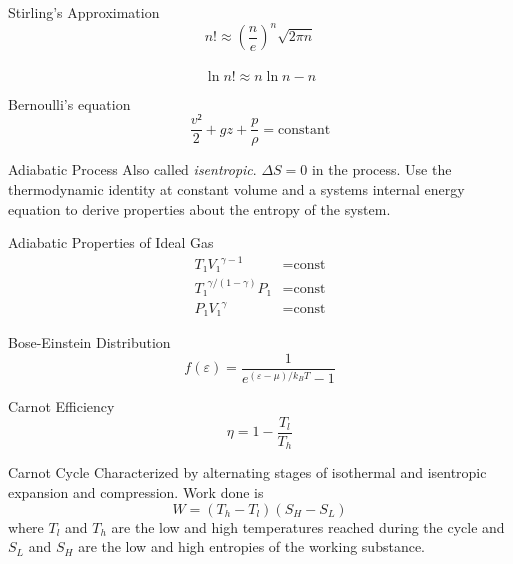 \documentclass[avery5371]{flashcards}
\begin{document}
\begin{flashcard}{Stirling's Approximation}
	\[ n! ≈ (\frac ne)^n \sqrt{2πn} \] \\
	\[ \ln n! ≈ n\ln n - n \]
\end{flashcard}


\begin{flashcard}{Bernoulli's equation}
	\[ \frac{v²}{2} + gz + \frac{p}{ρ} = \text{constant} \]
\end{flashcard}


\begin{flashcard}{Adiabatic Process}
	Also called \emph{isentropic}. $ΔS = 0$ in the process. Use the
	thermodynamic identity at constant volume and a systems internal energy
	equation to derive properties about the entropy of the system.
\end{flashcard}

\begin{flashcard}{Adiabatic Properties of Ideal Gas}
	\begin{align*}
		T₁ {V₁}^{γ-1} &= \text{const} \\
		{T₁}^{γ/(1-γ)} P₁ &= \text{const} \\
		P₁ {V₁}^γ &= \text{const}
	\end{align*}
\end{flashcard}

\begin{flashcard}{Bose-Einstein Distribution}
	\[ f(ε) = \frac{1}{e^{(ε-μ)/k_B T} - 1} \]
\end{flashcard}

\begin{flashcard}{Carnot Efficiency}
	\[ η = 1 - \frac{T_l}{T_h} \]
\end{flashcard}

\begin{flashcard}{Carnot Cycle}
	Characterized by alternating stages of isothermal and isentropic expansion
	and compression. Work done is
	\[ W = (T_h - T_l)(S_H - S_L) \]
	where $T_l$ and $T_h$ are the low and high temperatures reached during the
	cycle and $S_L$ and $S_H$ are the low and high entropies of the working
	substance.
\end{flashcard}
\end{document}
